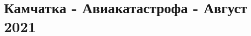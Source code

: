  
 
 
 
 
\section{Камчатка - Авиакатастрофа - Август 2021}
\label{sec:topics.kamchatka_aviakatastrofa_aug_2021}

